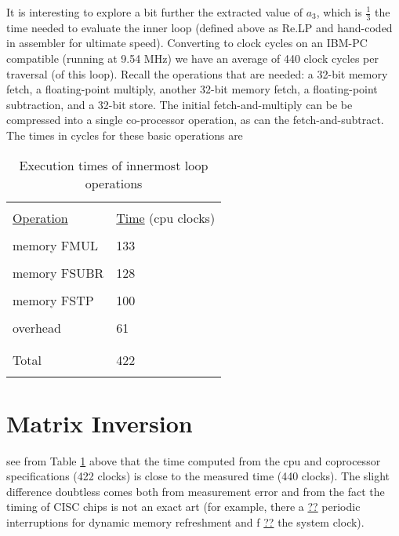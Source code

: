 It is interesting to explore a bit further the extracted value of $a_3$,
which is $\frac{1}{3}$ the time needed to evaluate the inner loop (defined
above as Re.LP and hand-coded in assembler for ultimate
speed). Converting to clock cycles on an IBM-PC compatible
(running at 9.54 MHz) we have an average of 440 clock cycles per
traversal (of this loop). Recall the operations that are needed: a
32-bit memory fetch, a floating-point multiply, another 32-bit
memory fetch, a floating-point subtraction, and a 32-bit store.
The initial fetch-and-multiply can be be compressed into a single
co-processor operation, as can the fetch-and-subtract. The times
in cycles for these basic operations are
\begin{table}
    \centering
    \caption{Execution times of innermost loop operations}
        \bigskip
    \label{tbl:09_02} 
    \setlength{\tabcolsep}{10pt}
        \begin{tabular}{|ll|}
            \hline &  \\
            \underline{Operation} & \underline{Time} \; (cpu clocks)\\
            &  \\
            memory FMUL &  133  \\
            &  \\
            memory FSUBR &  128  \\
            &  \\
            memory FSTP &  100  \\ 
            &  \\
            overhead &  61  \\ 
            &  \\
            \hline &  \\
            Total &  422  \\ 
            &  \\
            \hline
        \end{tabular}
\end{table}
 

\section{Matrix Inversion}
 see from Table \ref{tbl:09_02} above that the time computed from the
cpu and coprocessor specifications (422 clocks) is close to the
measured time (440 clocks). The slight difference doubtless
comes both from measurement error and from the fact the
timing of CISC chips is not an exact art (for example, there a \underline{??}
periodic interruptions for dynamic memory refreshment and f \underline{??}
the system clock).

